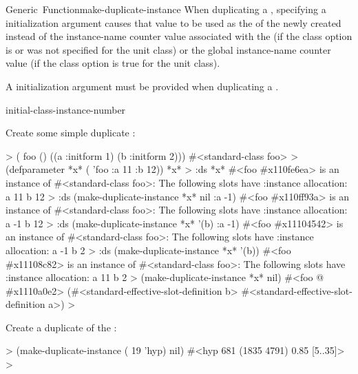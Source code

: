 \documentclass[10pt,twoside,english,pdftex]{article}
\begin{document}
\begin{functiondoc}{Generic~Function}{make-duplicate-instance}{%
     
     
    }
When duplicating a , specifying a
 initialization argument causes that value to be
used as the  of the newly created 
instead of the instance-name counter value associated with the
 (if the 
class option is \nil{} or was not specified for the unit class) or the global
instance-name counter value (if the
 class option is true for the
unit class).

A  initialization argument must be provided when
duplicating a .

\begin{alsos}{initial-class-instance-number}
\end{alsos}

\fnexamples
Create some simple duplicate :
%
%
%
%
\W\supp
\begin{example}
  > ( foo () 
       ((a :initform 1)
        (b :initform 2)))
  #<standard-class foo>
  > (defparameter *x* ( 'foo :a 11 :b 12))
  *x*
  > :ds *x*
  #<foo #x110fe6ea> is an instance of #<standard-class foo>:
   The following slots have :instance allocation:
    a   11
    b   12
  > :ds (make-duplicate-instance *x* nil :a -1)
  #<foo #x110ff93a> is an instance of #<standard-class foo>:
   The following slots have :instance allocation:
    a   -1
    b   12\goodpagebreak
  > :ds (make-duplicate-instance *x* '(b) :a -1)
  #<foo #x11104542> is an instance of #<standard-class foo>:
   The following slots have :instance allocation:
    a   -1
    b   2
  > :ds (make-duplicate-instance *x* '(b))
  #<foo #x11108c82> is an instance of #<standard-class foo>:
   The following slots have :instance allocation:
    a   11
    b   2
  > (make-duplicate-instance *x* nil)
  #<foo @ #x1110a0e2>
  (#<standard-effective-slot-definition b>
   #<standard-effective-slot-definition a>)
  >
\end{example}

% 
Create a duplicate of the   :
%
\W\supp
\begin{example}
  > (make-duplicate-instance ( 19 'hyp) nil)
  #<hyp 681 (1835 4791) 0.85 [5..35]>
  >
\end{example}

\end{functiondoc}
\end{document}
